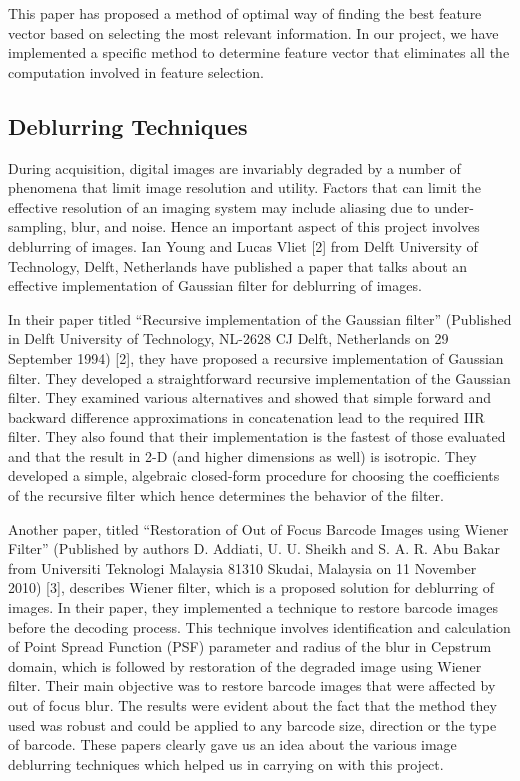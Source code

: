 \documentclass[times, 1pt, a4paper]{article}
\begin{document}
This paper has proposed a method of optimal way of finding the best feature vector based on selecting the most relevant information. In our project, we have implemented a specific method to determine feature vector that eliminates all the computation involved in feature selection.

\subsection{Deblurring Techniques} \label{subsection:deblurring_techniques}

During acquisition, digital images are invariably degraded by a number of phenomena that limit image resolution and utility. Factors that can limit the effective resolution of an imaging system may include aliasing due to under-sampling, blur, and noise. Hence an important aspect of this project involves deblurring of images. Ian Young and Lucas Vliet [2] from Delft University of Technology, Delft, Netherlands have published a paper that talks about an effective implementation of Gaussian filter for deblurring of images. 

In their paper titled “Recursive implementation of the Gaussian filter” (Published in Delft University of Technology, NL-2628 CJ Delft, Netherlands on 29 September 1994) [2], they have proposed a recursive implementation of Gaussian filter. They developed a straightforward recursive implementation of the Gaussian filter. They examined various alternatives and showed that simple forward and backward difference approximations in concatenation lead to the required IIR filter. They also found that their implementation is the fastest of those evaluated and that the result in 2-D (and higher dimensions as well) is isotropic. They developed a simple, algebraic closed-form procedure for choosing the coefficients of the recursive filter which hence determines the behavior of the filter.

Another paper, titled “Restoration of Out of Focus Barcode Images using Wiener Filter” (Published by authors D. Addiati, U. U. Sheikh and S. A. R. Abu Bakar from Universiti Teknologi Malaysia 81310 Skudai, Malaysia on 11 November 2010) [3], describes Wiener filter, which is a proposed solution for deblurring of images. In their paper, they implemented a technique to restore barcode images before the decoding process. This technique involves identification and calculation of Point Spread Function (PSF) parameter and radius of the blur in Cepstrum domain, which is followed by restoration of the degraded image using Wiener filter. Their main objective was to restore barcode images that were affected by out of focus blur. The results were evident about the fact that the method they used was robust and could be applied to any barcode size, direction or the type of barcode. These papers clearly gave us an idea about the various image deblurring techniques which helped us in carrying on with this project.
\end{document}
